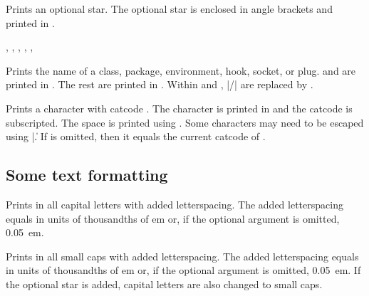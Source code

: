 \documentclass{beerydoc}
\begin{document}
\begin{codedoc}{\sarg}
  Prints an optional star.
  The optional star is enclosed in angle brackets and printed in .
\end{codedoc}

\begin{codedoc}{\cls, \pkg, \env, \hook, \socket, \plug}
  \begin{syntax}
        
        
        
       
     
       
  \end{syntax}
  Prints the name of a class, package, environment, hook, socket, or plug.
   and  are printed in .
  The rest are printed in .
  Within  and , |/| are replaced by .
\end{codedoc}

\begin{codedoc}{\charcode}
  \begin{syntax}
      
  \end{syntax}
  Prints a character  with catcode .
  The character is printed in  and the catcode is subscripted.
  The space is printed using .
  Some characters may need to be escaped using |\|.
  If  is omitted, then it equals the current catcode of
  .
\end{codedoc}

\subsection{Some text formatting}
\label{subsec:text}

\begin{codedoc}{\allcaps}
  \begin{syntax}
      
  \end{syntax}
  Prints  in all capital letters with added letterspacing.
  The added letterspacing equals  in units of thousandths of
  \unit{em} or, if the optional argument is omitted, \qty{0.05}{em}.
\end{codedoc}

\begin{codedoc}{\allsmallcaps}
  \begin{syntax}
     \sarg{}  
  \end{syntax}
  Prints  in all small caps with added letterspacing.
  The added letterspacing equals  in units of thousandths of
  \unit{em} or, if the optional argument is omitted, \qty{0.05}{em}.
  If the optional star is added, capital letters are also changed to small
  caps.
\end{codedoc}
\end{document}
